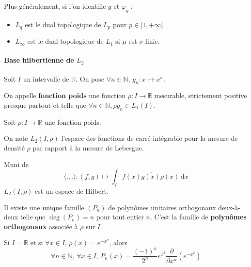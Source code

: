 
  \begin{remark}
    Plus généralement, si l'on identifie $g$ et $\varphi_g$ :
    \begin{itemize}
      \item $L_q$ est le dual topologique de $L_p$ pour $p \in ]1, +\infty[$.
      \item $L_\infty$ est le dual topologique de $L_1$ si $\mu$ est $\sigma$-finie.
    \end{itemize}
  \end{remark}

  \paragraph{Base hilbertienne de \texorpdfstring{$L_2$}{L₂}}


  Soit $I$ un intervalle de $\mathbb{R}$. On pose $\forall n \in \mathbb{N}$, $g_n : x \mapsto x^n$.

  \begin{definition}
    On appelle \textbf{fonction poids} une fonction $\rho : I \rightarrow \mathbb{R}$ mesurable, strictement positive presque partout et telle que $\forall n \in \mathbb{N}, \rho g_n \in L_1(I)$.
  \end{definition}

  Soit $\rho : I \rightarrow \mathbb{R}$ une fonction poids.

  \begin{notation}
    On note $L_2(I, \rho)$ l'espace des fonctions de carré intégrable pour la mesure de densité $\rho$ par rapport à la mesure de Lebesgue.
  \end{notation}

  \begin{proposition}
    Muni de
    \[ \langle ., . \rangle : (f,g) \mapsto \int_I f(x) \overline{g(x)} \rho(x) \, \mathrm{d}x \]
    $L_2(I, \rho)$ est un espace de Hilbert.
  \end{proposition}

  \begin{theorem}
    Il existe une unique famille $(P_n)$ de polynômes unitaires orthogonaux deux-à-deux telle que $\deg(P_n) = n$ pour tout entier $n$. C'est la famille de \textbf{polynômes orthogonaux} associée à $\rho$ sur $I$.
  \end{theorem}

  \begin{example}
    Si $I = \mathbb{R}$ et si $\forall x \in I, \, \rho(x) = e^{-x^2}$, alors
    \[ \forall n \in \mathbb{N}, \, \forall x \in I, \, P_n(x) = \frac{(-1)^n}{2^n} e^{x^2} \frac{\partial}{\partial x^n} \left( e^{-x^2} \right) \]
  \end{example}

